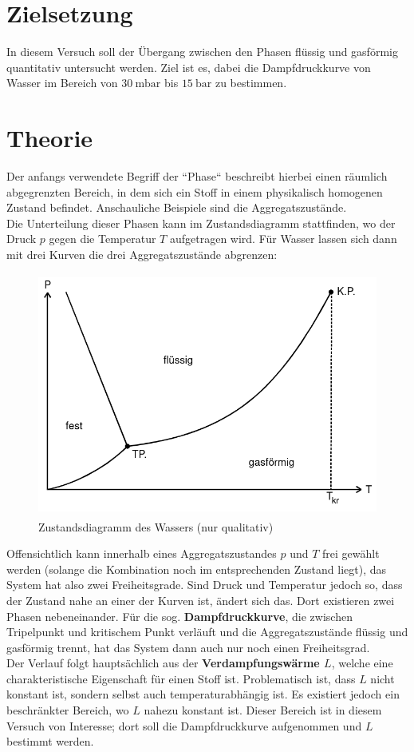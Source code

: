 \section*{Zielsetzung}
\label{sec:Zielsetzung}
In diesem Versuch soll der Übergang zwischen den Phasen flüssig und gasförmig quantitativ
untersucht werden. Ziel ist es, dabei die Dampfdruckkurve von Wasser im Bereich von
$\SI{30}{\milli\bar}$ bis $\SI{15}{\bar}$ zu bestimmen.

\section{Theorie}
\label{sec:Theorie}
Der anfangs verwendete Begriff der ``Phase`` beschreibt hierbei einen räumlich
abgegrenzten Bereich, in dem sich ein Stoff in einem physikalisch homogenen Zustand
befindet. Anschauliche Beispiele sind die Aggregatszustände.
\\
Die Unterteilung dieser Phasen kann im Zustandsdiagramm stattfinden, wo der Druck $p$
gegen die Temperatur $T$ aufgetragen wird. Für Wasser lassen sich dann mit drei Kurven
die drei Aggregatszustände abgrenzen:
\begin{figure}[H]
	\centering
	\includegraphics[height=8cm]{images/Zustandsdiagramm.png}
	\caption{Zustandsdiagramm des Wassers (nur qualitativ) \cite{anleitung}}
	\label{fig:zustandsdiagramm}
\end{figure}
\noindent
Offensichtlich kann innerhalb eines Aggregatszustandes $p$ und $T$ frei gewählt werden
(solange die Kombination noch im entsprechenden Zustand liegt), das System hat also zwei Freiheitsgrade.
Sind Druck und Temperatur jedoch so, dass der Zustand nahe an einer der Kurven ist, ändert
sich das. Dort existieren zwei Phasen nebeneinander. Für die sog. \textbf{Dampfdruckkurve}, die
zwischen Tripelpunkt und kritischem Punkt verläuft und die Aggregatszustände flüssig und
gasförmig trennt, hat das System dann auch nur noch einen Freiheitsgrad.
\\
Der Verlauf folgt hauptsächlich aus der \textbf{Verdampfungswärme $L$}, welche eine
charakteristische Eigenschaft für einen Stoff ist. Problematisch ist, dass $L$ nicht
konstant ist, sondern selbst auch temperaturabhängig ist. Es existiert jedoch ein
beschränkter Bereich, wo $L$ nahezu konstant ist. Dieser Bereich ist in diesem Versuch
von Interesse; dort soll die Dampfdruckkurve aufgenommen und $L$ bestimmt werden.

